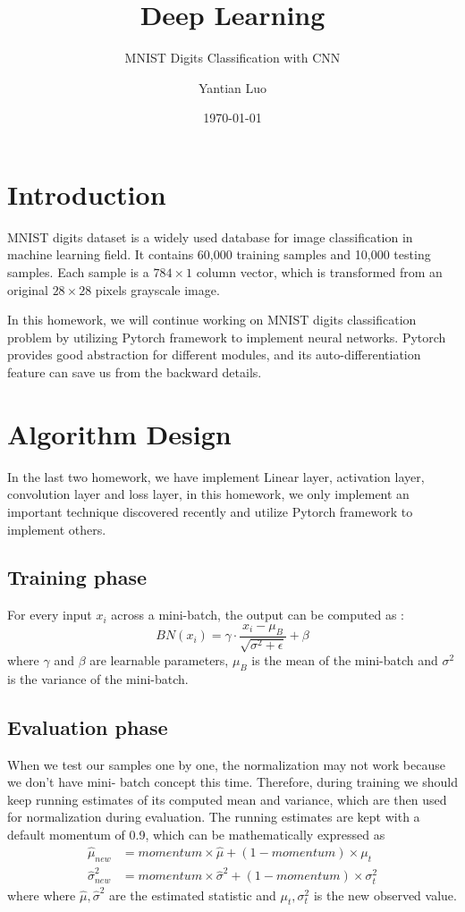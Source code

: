 \documentclass{elegantbook}
\title{Deep Learning}
\subtitle{MNIST Digits Classification with CNN}
\author{Yantian Luo}
\institute{Electronic Engineering}
\date{\today}
\begin{document}
\maketitle
\tableofcontents
\mainmatter
\hypersetup{pageanchor=true}
\chapter{Introduction}
MNIST digits dataset is a widely used database for image classification in machine learning field. It contains 60,000 training samples and 10,000 testing samples. Each sample is a $784\times1$ column vector, which is transformed from an original $28\times28$ pixels grayscale image.

In this homework, we will continue working on MNIST digits classification problem by utilizing Pytorch framework to implement neural networks. Pytorch provides good abstraction for different modules, and its auto-differentiation feature can save us from the backward details.

\chapter{Algorithm Design}
In the last two homework, we have implement Linear layer, activation layer, convolution layer and loss layer, in this homework, we only implement an important technique discovered recently and utilize Pytorch framework to implement others.

\section{Training phase}
For every input $x_i$ across a mini-batch, the output can be computed as :
\begin{equation}
BN(x_i)=\gamma \cdot \frac{x_i-\mu_B}{\sqrt{\sigma^2+\epsilon}}+\beta
\end{equation}
where $\gamma$ and $\beta$ are learnable parameters, $\mu_B$ is the mean of the mini-batch and $\sigma^2$ is the variance of the mini-batch.

\section{Evaluation phase}
When we test our samples one by one, the normalization may not work because we don’t have mini- batch concept this time. Therefore, during training we should keep running estimates of its computed mean and variance, which are then used for normalization during evaluation. The running estimates are kept with a default momentum of 0.9, which can be mathematically expressed as
\begin{equation}
\begin{aligned}
\hat{\mu}_{new} &= momentum \times \hat{\mu} + (1-momentum)\times \mu_t \\
\hat{\sigma}_{new}^2 &= momentum \times \hat{\sigma}^2 + (1-momentum)\times \sigma_t^2
\end{aligned}
\end{equation}
where where $\hat{\mu},\hat{\sigma}^2$ are the estimated statistic and $\mu_t,\sigma_t^2$ is the new observed value. 
\end{document}
